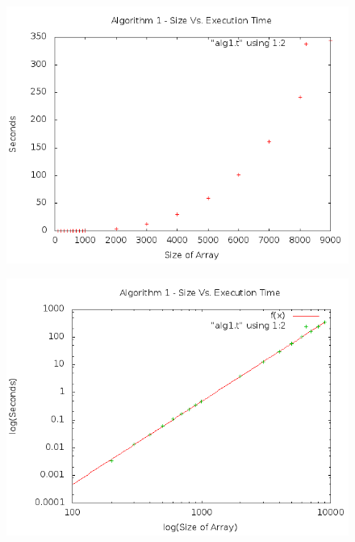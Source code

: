 \documentclass[a4paper,10pt]{article}
\begin{document}
			\begin{figure}[!htb]
				\centering
				\includegraphics[scale=.5]{timingfiles/alg1plot.png}
			\end{figure}
			\begin{figure}[!htb]
				\centering
				\includegraphics[scale=.5]{timingfiles/alg1plotlog.png}
			\end{figure}
		\newpage
\end{document}
